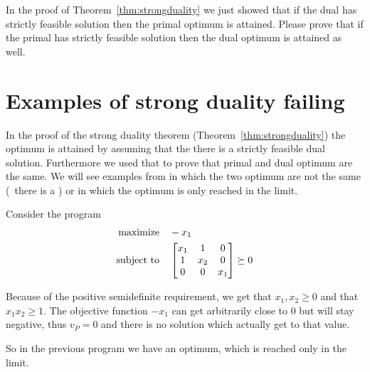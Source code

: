\documentclass[a4paper,twoside,justified]{tufte-handout}
\begin{document}
\begin{exercise}
  In the proof of Theorem~\ref{thm:strongduality} we just showed that
  if the dual has strictly feasible solution then the primal optimum
  is attained. Please prove that if the primal has strictly feasible
  solution then the dual optimum is attained as well.
\end{exercise}

\section{Examples of strong duality failing}

In the proof of the strong duality theorem
(Theorem~\ref{thm:strongduality}) the optimum is attained by assuming
that the there is a strictly feasible dual solution. Furthermore we
used that to prove that primal and dual optimum are the same.  We will
see examples from\cite{lovasz2003semidefinite} in which the
two optimum are not the same (\ie\ there is a ) or in which the optimum is only reached in the limit.

\begin{example}\label{eg:sdp-limit-solution}
  Consider the program
  \begin{alignat*}{2}
    \text{maximize}\hspace{1em}& -x_{1}\\
    \text{subject to}\hspace{1em}& \begin{bmatrix}
      x_{1} & 1 & 0\\
      1 & x_{2} & 0 \\
      0 & 0 & x_{1}
    \end{bmatrix}\succeq 0
  \end{alignat*}

  Because of the positive semidefinite requirement, we get that $
  x_{1},x_{2}\geq 0 $ and that $ x_{1}x_{2}\geq 1 $. The objective
  function $ -x_{1} $ can get arbitrarily close to $ 0 $ but will stay
  negative, thus $ v_{P}=0 $ and there is no solution which actually
  get to that value.
\end{example}

So in the previous program we have an optimum, which is reached only
in the limit.
\end{document}
